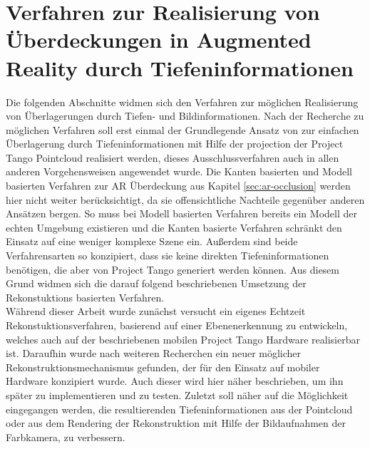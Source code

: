 \chapter{Verfahren zur Realisierung von Überdeckungen in Augmented Reality durch Tiefen\-informationen} \label{sec:optimization}


Die folgenden Abschnitte widmen sich den Verfahren zur möglichen Realisierung von Überlagerungen durch Tiefen- und Bildinformationen. Nach der Recherche zu möglichen Verfahren soll erst einmal der Grundlegende Ansatz von \citet{wloka1995resolving} zur einfachen Überlagerung durch Tiefeninformationen mit Hilfe der projection der Project Tango Pointcloud realisiert werden, dieses Ausschlussverfahren auch in allen anderen Vorgehensweisen angewendet wurde. Die Kanten basierten und Modell basierten Verfahren zur AR Überdeckung aus Kapitel \ref{sec:ar-occlusion} werden hier nicht weiter berücksichtigt, da sie offensichtliche Nachteile gegenüber anderen Ansätzen bergen. So muss bei Modell basierten Verfahren bereits ein Modell der echten Umgebung existieren und die Kanten basierte Verfahren schränkt den Einsatz auf eine weniger komplexe Szene ein. Außerdem sind beide Verfahrensarten so konzipiert, dass sie keine direkten Tiefeninformationen benötigen, die aber von Project Tango generiert werden können. Aus diesem Grund widmen sich die darauf folgend beschriebenen Umsetzung der Rekonstuktions basierten Verfahren.\\

Während dieser Arbeit wurde zunächst versucht ein eigenes Echtzeit Rekonstuktionsverfahren, basierend auf einer Ebenenerkennung zu entwickeln, welches auch auf der beschriebenen mobilen Project Tango Hardware realisierbar ist. Daraufhin wurde nach weiteren Recherchen ein neuer möglicher Rekonstruktionsmechanismus gefunden, der für den Einsatz auf mobiler Hardware konzipiert wurde. Auch dieser wird hier näher beschrieben, um ihn später zu implementieren und zu testen. Zuletzt soll näher auf die Möglichkeit eingegangen werden, die resultierenden Tiefeninformationen aus der Pointcloud oder aus dem Rendering der Rekonstruktion mit Hilfe der Bildaufnahmen der Farbkamera, zu verbessern. \\









